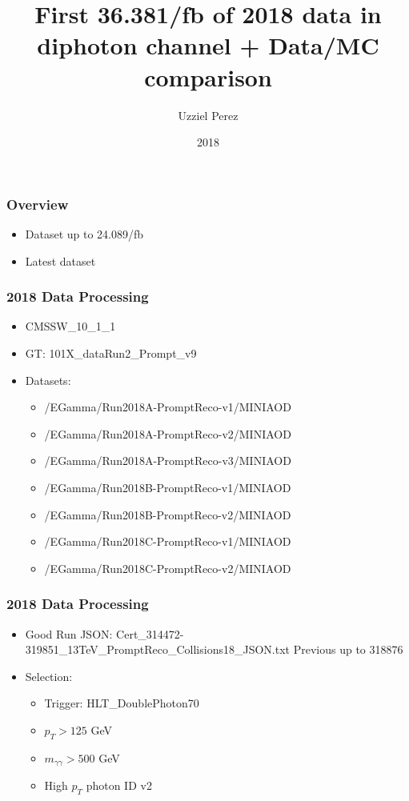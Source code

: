 \documentclass{beamer}
\title{First 36.381/fb of 2018 data in diphoton channel + Data/MC comparison}
\author{Uzziel Perez}
\institute{University of Alabama}
\date{2018}
\begin{document}
\frame{\titlepage}

\begin{frame}
\frametitle{Overview}
\begin{itemize}
  \item Dataset up to 24.089/fb
  \item Latest dataset
\end{itemize}
\end{frame}


\begin{frame}
\frametitle{2018 Data Processing}
\begin{itemize}
  \item CMSSW\_10\_1\_1
  \item GT: 101X\_dataRun2\_Prompt\_v9
  \item Datasets:
  \begin{itemize}
    \item /EGamma/Run2018A-PromptReco-v1/MINIAOD
    \item /EGamma/Run2018A-PromptReco-v2/MINIAOD
    \item /EGamma/Run2018A-PromptReco-v3/MINIAOD
    \item /EGamma/Run2018B-PromptReco-v1/MINIAOD
    \item /EGamma/Run2018B-PromptReco-v2/MINIAOD
    \item /EGamma/Run2018C-PromptReco-v1/MINIAOD
    \item /EGamma/Run2018C-PromptReco-v2/MINIAOD
  \end{itemize}
\end{itemize}
\end{frame}

\begin{frame}
\frametitle{2018 Data Processing}
\begin{itemize}
  \item Good Run JSON: {\fontsize{90}{60} Cert\_314472-319851\_13TeV\_PromptReco\_Collisions18\_JSON.txt}
  {\small Previous up to 318876}
  \item Selection:
  \begin{itemize}
    \item Trigger: HLT\_DoublePhoton70
    \item $p_{T} > 125$ GeV
    \item $m_{\gamma\gamma} > 500$ GeV
    \item High $p_{T}$ photon ID v2
  \end{itemize}
\end{itemize}
\end{frame}
\end{document}

